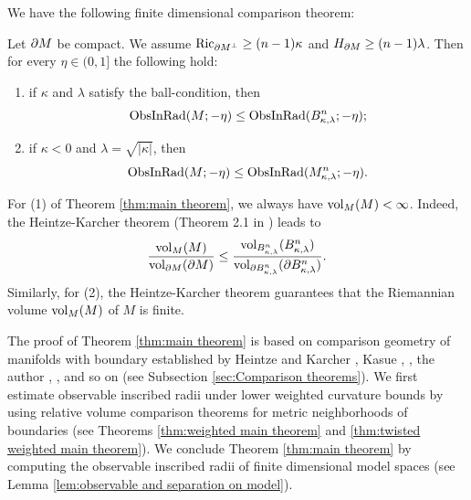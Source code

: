 We have the following finite dimensional comparison theorem:
\begin{thm}\label{thm:main theorem}
Let $\partial M$ be compact.
We assume $\operatorname{Ric}_{\partial M^{\perp}}\geq (n-1)\kappa$ and $H_{\partial M}\geq (n-1)\lambda$.
Then for every $\eta \in (0,1]$
the following hold:
\begin{enumerate}
\item if $\kappa$ and $\lambda$ satisfy the ball-condition,
         then
         \begin{equation*}
         \operatorname{ObsInRad}(M;-\eta) \leq \operatorname{ObsInRad}(B^{n}_{\kappa,\lambda};-\eta);
         \end{equation*}
\item if $\kappa<0$ and $\lambda=\sqrt{\vert \kappa \vert}$,
         then
         \begin{equation*}
         \operatorname{ObsInRad}(M;-\eta) \leq \operatorname{ObsInRad}(M^{n}_{\kappa,\lambda};-\eta).
         \end{equation*}
\end{enumerate}
\end{thm}
\begin{rem}\label{rem:finite volume}
For (1) of Theorem \ref{thm:main theorem},
we always have $\operatorname{vol}_{M} (M)<\infty$.
Indeed,
the Heintze-Karcher theorem (Theorem 2.1 in \cite{HK}) leads to
\begin{equation*}
\frac{\operatorname{vol}_{M} (M)}{\operatorname{vol}_{\partial M} (\partial M)}\leq \frac{\operatorname{vol}_{B^{n}_{\kappa,\lambda}} (B^{n}_{\kappa,\lambda})}{\operatorname{vol}_{\partial B^{n}_{\kappa,\lambda}} (\partial B^{n}_{\kappa,\lambda})}.
\end{equation*}
Similarly,
for (2),
the Heintze-Karcher theorem guarantees that
the Riemannian volume $\operatorname{vol}_{M} (M)$ of $M$ is finite.
\end{rem}

The proof of Theorem \ref{thm:main theorem} is based on comparison geometry of manifolds with boundary
established by Heintze and Karcher \cite{HK}, Kasue \cite{K1}, \cite{K2}, the author \cite{S1}, \cite{S2}, and so on (see Subsection \ref{sec:Comparison theorems}).
We first estimate observable inscribed radii under lower weighted curvature bounds by using relative volume comparison theorems for metric neighborhoods of boundaries (see Theorems \ref{thm:weighted main theorem} and \ref{thm:twisted weighted main theorem}).
We conclude Theorem \ref{thm:main theorem} by computing the observable inscribed radii of finite dimensional model spaces (see Lemma \ref{lem:observable and separation on model}).

